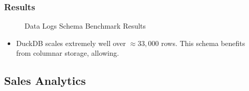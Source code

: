 \subsubsection{Results}
\begin{figure}[h!]
    \centering
    \vspace{-0.4em}
    \resizebox{\textwidth}{!}{}
    \caption{Data Logs Schema Benchmark Results}
    \label{fig:data_log_benchmark_results}
\end{figure}
\begin{itemize}
    \setlength\itemsep{0em}
    \item DuckDB scales extremely well over $\approx 33,000$ rows. This schema benefits from columnar storage, allowing. 
\end{itemize}
\subsection{Sales Analytics}
